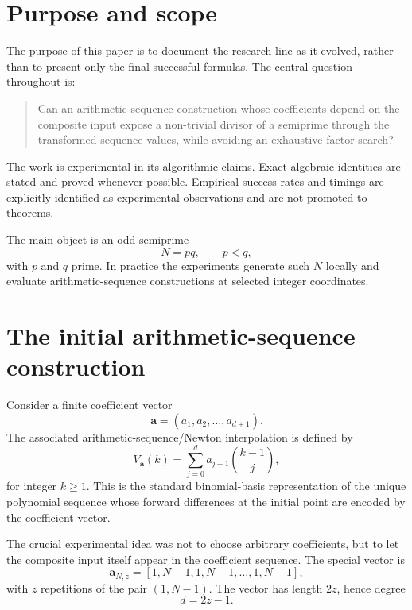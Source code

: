 \documentclass[11pt,a4paper]{article}
\newcommand{\Arith}{\mathrm{ArithSeg}}
\begin{document}
\newpage

\tableofcontents
\newpage

\section{Purpose and scope}
\label{sec:scope}

The purpose of this paper is to document the \Arith{} research line as it evolved, rather than to present only the final successful formulas. The central question throughout is:

\begin{quote}
Can an arithmetic-sequence construction whose coefficients depend on the composite input expose a non-trivial divisor of a semiprime through the transformed sequence values, while avoiding an exhaustive factor search?
\end{quote}

The work is experimental in its algorithmic claims. Exact algebraic identities are stated and proved whenever possible. Empirical success rates and timings are explicitly identified as experimental observations and are not promoted to theorems.

The main object is an odd semiprime
\[
N=pq,
\qquad p<q,
\]
with $p$ and $q$ prime. In practice the experiments generate such $N$ locally and evaluate arithmetic-sequence constructions at selected integer coordinates.

\section{The initial arithmetic-sequence construction}
\label{sec:initial}

Consider a finite coefficient vector
\[
\mathbf a=(a_1,a_2,\ldots,a_{d+1}).
\]
The associated arithmetic-sequence/Newton interpolation is defined by
\begin{equation}
\boxed{
V_{\mathbf a}(k)=\sum_{j=0}^{d} a_{j+1}\binom{k-1}{j},
}
\label{eq:newton}
\end{equation}
for integer $k\ge 1$. This is the standard binomial-basis representation of the unique polynomial sequence whose forward differences at the initial point are encoded by the coefficient vector.

The crucial experimental idea was not to choose arbitrary coefficients, but to let the composite input itself appear in the coefficient sequence. The special vector is
\begin{equation}
\mathbf a_{N,z}
=
[1,N-1,1,N-1,\ldots,1,N-1],
\label{eq:alternating-input}
\end{equation}
with $z$ repetitions of the pair $(1,N-1)$. The vector has length $2z$, hence degree
\begin{equation}
\boxed{d=2z-1.}
\label{eq:d}
\end{equation}
\end{document}
